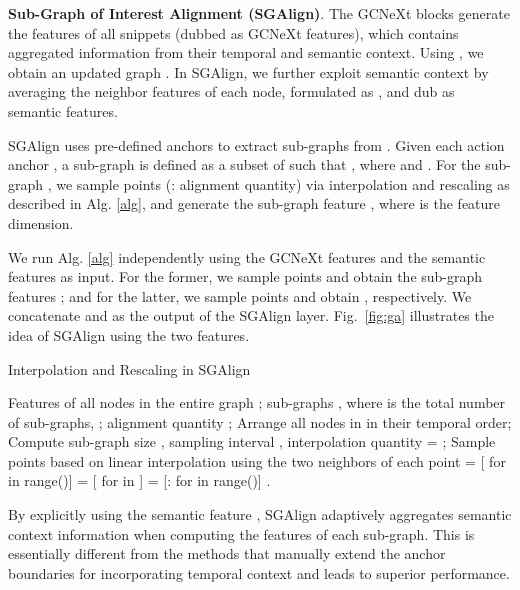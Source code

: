 \documentclass[10pt,twocolumn,letterpaper]{article}
\begin{document}
\noindent
\textbf{Sub-Graph of Interest Alignment (SGAlign)}. 
The GCNeXt blocks generate the features of all snippets  (dubbed as GCNeXt features), which contains aggregated information from their temporal and semantic context. Using , we obtain an updated graph . In SGAlign, we further exploit semantic context  
by averaging the neighbor features of each node, formulated as , and dub   as semantic features.

SGAlign uses pre-defined anchors to extract sub-graphs from . Given each action anchor , a sub-graph  is defined as a subset of  such that  , where  and .
For the sub-graph ,  we sample   points (: alignment quantity) via interpolation and rescaling as described in Alg. \ref{alg}, and generate the sub-graph feature  , where  is the feature dimension.

We run Alg. \ref{alg} independently using the GCNeXt features  and the semantic features  as input. For the former, we sample  points and obtain the sub-graph features  ; and for the latter, we sample   points and obtain , respectively. We concatenate  and  as the output of the SGAlign layer.  Fig.~\ref{fig:ga} illustrates the idea of SGAlign using the two features.





\begin{algorithm}[t]



\caption{ Interpolation and Rescaling in SGAlign }
\begin{algorithmic}[1]
\REQUIRE   Features of all nodes in the entire graph ; sub-graphs , where  is the total number of sub-graphs, ; alignment quantity ;
\STATE Arrange all nodes in  in their temporal order;
\STATE Compute sub-graph size , sampling interval ,  interpolation quantity   = ;
\STATE Sample  points based on linear interpolation using the two neighbors of each point  = [ for  in range()]
\STATE  = [ for  in ]
\STATE  = [: for  in range()]
\ENDFOR
\ENSURE .
\end{algorithmic}


 \label{alg}
\end{algorithm}


By explicitly using the semantic feature , SGAlign  adaptively aggregates semantic context information when computing the features of each sub-graph. This is essentially different from the methods that manually extend the anchor boundaries for incorporating temporal context \cite{lin2018bsn, zhao2017temporal} and leads to superior performance. 
\end{document}
